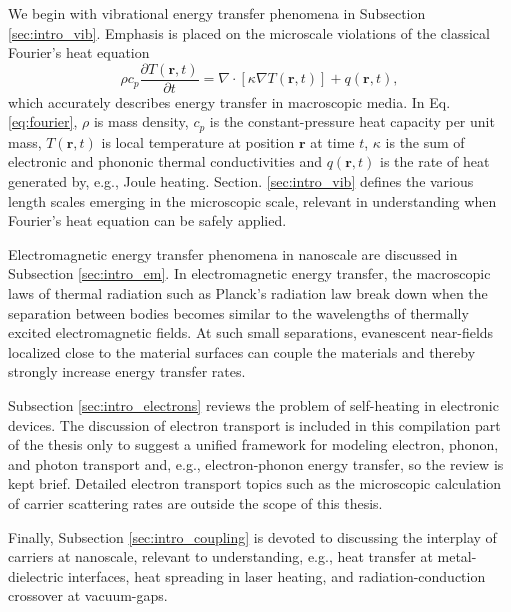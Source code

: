 We begin with vibrational energy transfer phenomena in Subsection \ref{sec:intro_vib}. Emphasis is placed on the microscale violations of the classical Fourier's heat equation \cite{fetter}
\begin{equation}
 \rho c_p \frac{\partial T(\mathbf{r},t)}{\partial t} =  \nabla \cdot [\kappa \nabla T(\mathbf{r},t)] + q(\mathbf{r},t), \label{eq:fourier}
\end{equation}
which accurately describes energy transfer in macroscopic media. In Eq. \eqref{eq:fourier}, $\rho$ is mass density, $c_p$ is the constant-pressure heat capacity per unit mass, $T(\mathbf{r},t)$ is local temperature at position $\mathbf{r}$ at time $t$, $\kappa$ is the sum of electronic and phononic thermal conductivities and $q(\mathbf{r},t)$ is the rate of heat generated by, e.g., Joule heating. Section. \ref{sec:intro_vib} defines the various length scales emerging in the microscopic scale, relevant in understanding when Fourier's heat equation can be safely applied. 


Electromagnetic energy transfer phenomena in nanoscale are discussed in Subsection \ref{sec:intro_em}. In electromagnetic energy transfer, the macroscopic laws of thermal radiation such as Planck's radiation law break down when the separation between bodies becomes similar to the wavelengths of thermally excited electromagnetic fields. At such small separations, evanescent near-fields localized close to the material surfaces can couple the materials and thereby strongly increase energy transfer rates. %

Subsection \ref{sec:intro_electrons} reviews the problem of self-heating in electronic devices. The discussion of electron transport is included in this compilation part of the thesis only to suggest a unified framework for modeling electron, phonon, and photon transport and, e.g., electron-phonon energy transfer, so the review is kept brief. Detailed electron transport topics such as the microscopic calculation of carrier scattering rates \cite{ziman} are outside the scope of this thesis.  %

Finally, Subsection \ref{sec:intro_coupling} is devoted to discussing the interplay of carriers at nanoscale, relevant to understanding, e.g., heat transfer at metal-dielectric interfaces, heat spreading in laser heating, and radiation-conduction crossover at vacuum-gaps.

